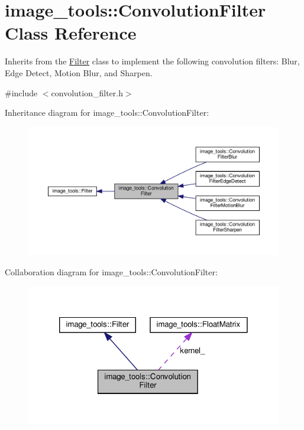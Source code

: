 \hypertarget{classimage__tools_1_1ConvolutionFilter}{}\section{image\+\_\+tools\+:\+:Convolution\+Filter Class Reference}
\label{classimage__tools_1_1ConvolutionFilter}


Inherits from the \hyperlink{classimage__tools_1_1Filter}{Filter} class to implement the following convolution filters\+: Blur, Edge Detect, Motion Blur, and Sharpen.  




{\ttfamily \#include $<$convolution\+\_\+filter.\+h$>$}



Inheritance diagram for image\+\_\+tools\+:\+:Convolution\+Filter\+:
\nopagebreak
\begin{figure}[H]
\begin{center}
\leavevmode
\includegraphics[width=350pt]{classimage__tools_1_1ConvolutionFilter__inherit__graph}
\end{center}
\end{figure}


Collaboration diagram for image\+\_\+tools\+:\+:Convolution\+Filter\+:
\nopagebreak
\begin{figure}[H]
\begin{center}
\leavevmode
\includegraphics[width=320pt]{classimage__tools_1_1ConvolutionFilter__coll__graph}
\end{center}
\end{figure}
